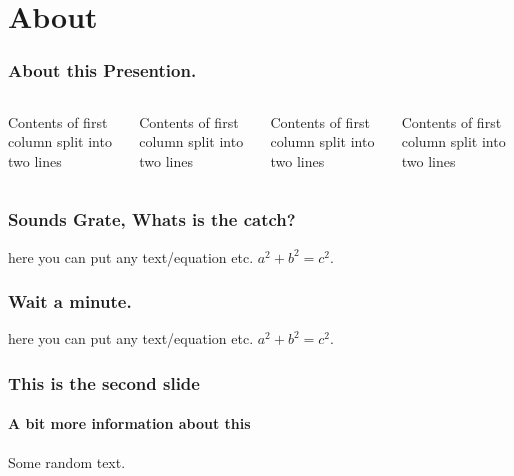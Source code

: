 \documentclass[usenames,xcolor={dvipsnames}]{beamer}
\begin{document}
\usebackgroundtemplate{ }    %
     \section{About}
	\begin{frame}
	  \frametitle{ About this Presention.  }
	   \begin{columns}[T] %
     \begin{column}{.23\textwidth} %
     Contents of first column \newline split into two lines
     \end{column}
     \begin{column}{.23\textwidth} %
     Contents of first column \newline split into two lines
     \end{column}
     \begin{column}{.23\textwidth} %
     Contents of first column \newline split into two lines
     \end{column}
     \begin{column}{.23\textwidth} %
     Contents of first column \newline split into two lines
     \end{column}
     \end{columns}
	\end{frame}
	\begin{frame}
	  \frametitle{ Sounds Grate, Whats is the catch? }
		here you can put any text/equation etc. 
		$a^2 + b^2 = c^2$.		
	\end{frame}\begin{frame}
	  \frametitle{ Wait a minute. }
		here you can put any text/equation etc. 
		$a^2 + b^2 = c^2$.		
	\end{frame}
	\begin{frame}
		\frametitle{This is the second slide}
		\framesubtitle{A bit more information about this}
		Some random text.		
	\end{frame}
\end{document}
